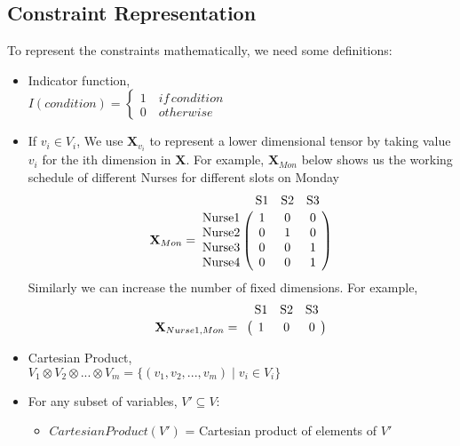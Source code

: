\documentclass{article}
\begin{document}

\subsection{Constraint Representation}
To represent the constraints mathematically, we need some definitions:
\begin{itemize}
\item Indicator function, \\
$I(condition) = \left\{
\begin{array}{ll}
1 \quad if \, condition\\
0 \quad otherwise
\end{array}
\right.$\\
\item If $v_i \in V_i$, We use $\textbf{X}_{v_i}$ to represent a lower dimensional tensor by taking value $v_i$ for the ith dimension in $\textbf{X}$. For example, $\textbf{X}_{Mon}$ below shows us the working schedule of different Nurses for different slots on Monday
\[
\textbf{X}_{Mon}
=
\bordermatrix{
    \text{}   & \text{S1} & \text{S2} & \text{S3} \cr
    \text{Nurse1} & 1 & 0 & 0 \cr
    \text{Nurse2} & 0 & 1 & 0 \cr
    \text{Nurse3} & 0 & 0 & 1 \cr
    \text{Nurse4} & 0 & 0 & 1 
}
\]
Similarly we can increase the number of fixed dimensions. For example, 
\[
\textbf{X}_{Nurse1, Mon} 
= 
\bordermatrix{
    \text{}   & \text{S1} & \text{S2} & \text{S3} \cr
    \text{} & 1 & 0 & 0 
}
\]
\item Cartesian Product, \\
$V_1 \otimes V_2 \otimes ... \otimes V_m = \{(v_{1},v_{2},...,v_{m}) \mid v_{i} \in V_i \}$ 
\item For any subset of variables, $V' \subseteq V$: 
\begin{itemize}
\item$CartesianProduct(V')$ = Cartesian product of elements of $V'$
\end{itemize}
\end{itemize}
\end{document}
